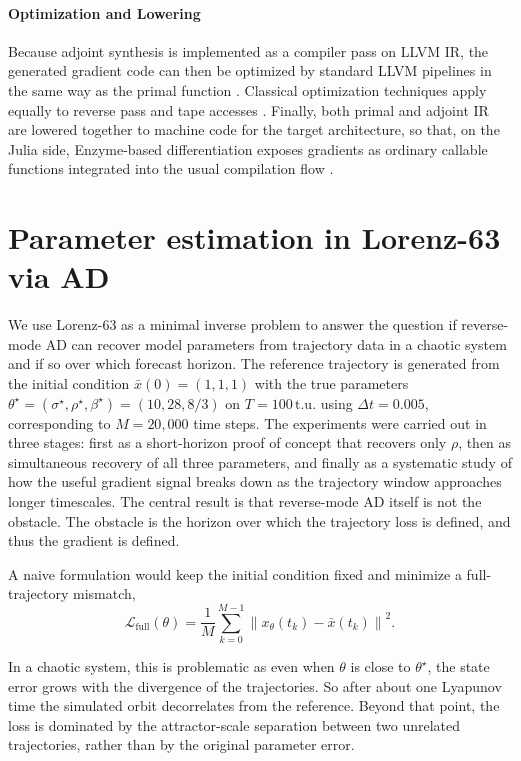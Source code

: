 \paragraph{Optimization and Lowering}

Because adjoint synthesis is implemented as a compiler pass on LLVM IR, the generated gradient code can then be optimized by standard LLVM pipelines in the same way as the primal function \parencite{moses_instead_2020,moses_enzyme_2020}. Classical optimization techniques apply equally to reverse pass and tape accesses \parencite{moses_enzyme_2020}. Finally, both primal and adjoint IR are lowered together to machine code for the target architecture, so that, on the Julia side, Enzyme-based differentiation exposes gradients as ordinary callable functions integrated into the usual compilation flow \parencite{moses_reverse-mode_2021}.

\section{Parameter estimation in Lorenz-63 via AD}
\label{sec:param_estimation}

We use Lorenz-63 as a minimal inverse problem to answer the question if reverse-mode AD can recover model parameters from trajectory data in a chaotic system and if so over which forecast horizon. The reference trajectory is generated from the initial condition $\bar{x}(0)=(1,1,1)$ with the true parameters $\theta^\star=(\sigma^\star,\rho^\star,\beta^\star)=(10,28,8/3)$ on $T=100\,\mathrm{t.u.}$ using $\Delta t=0.005$, corresponding to $M=20{,}000$ time steps. The experiments were carried out in three stages: first as a short-horizon proof of concept that recovers only $\rho$, then as simultaneous recovery of all three parameters, and finally as a systematic study of how the useful gradient signal breaks down as the trajectory window approaches longer timescales. The central result is that reverse-mode AD itself is not the obstacle. The obstacle is the horizon over which the trajectory loss is defined, and thus the gradient is defined.

A naive formulation would keep the initial condition fixed and minimize a full-trajectory mismatch,
\begin{equation}
    \mathcal{L}_{\mathrm{full}}(\theta) = \frac{1}{M}\sum_{k=0}^{M-1}\left\|x_\theta(t_k)-\bar{x}(t_k)\right\|^2.
\end{equation}

In a chaotic system, this is problematic as even when $\theta$ is close to $\theta^\star$, the state error grows with the divergence of the trajectories. So after about one Lyapunov time the simulated orbit decorrelates from the reference. Beyond that point, the loss is dominated by the attractor-scale separation between two unrelated trajectories, rather than by the original parameter error.

